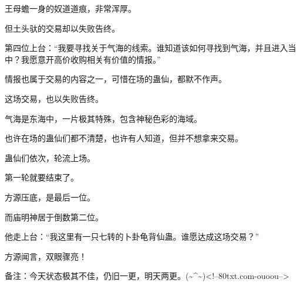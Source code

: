 \begin{this_body}
王母蟾一身的奴道道痕，非常浑厚。

但土头驮的交易却以失败告终。

第四位上台：“我要寻找关于气海的线索。谁知道该如何寻找到气海，并且进入当中？我愿意开高价收购相关有价值的情报。”

情报也属于交易的内容之一，可惜在场的蛊仙，都默不作声。

这场交易，也以失败告终。

气海是东海中，一片极其特殊，包含神秘色彩的海域。

也许在场的蛊仙们都不清楚，也许有人知道，但并不想拿来交易。

蛊仙们依次，轮流上场。

第一轮就要结束了。

方源压底，是最后一位。

而庙明神居于倒数第二位。

他走上台：“我这里有一只七转的卜卦龟背仙蛊。谁愿达成这场交易？”

方源闻言，双眼骤亮！

备注：今天状态极其不佳，仍旧一更，明天两更。(\~{}\^{}\~{})<!--80txt.com-ouoou-->

\end{this_body}

